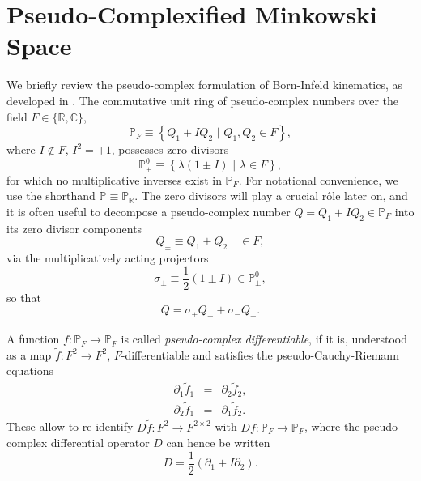 \documentclass[a4paper,aps,prd,showkeys,showpacs,superscriptaddress,preprint]{revtex4}
\newcommand{\pc}{\mathbb{P}}
\newcommand{\reals}{\mathbb{R}}
\begin{document}
\section{Pseudo-Complexified Minkowski Space\label{sec_pcM}}
We briefly review the pseudo-complex formulation of Born-Infeld
kinematics, as developed in \cite{Schuller:2002fn, Schuller:2002rr}.
The commutative unit ring of pseudo-complex numbers  over the field
$F \in \{\reals, \mathbb{C}\}$,
\begin{equation}
  \pc_F \equiv \left\{ Q_1 + I Q_2 \,\, | \,\, Q_1, Q_2 \in F \right\},
\end{equation}
where $I \not\in F$, $I^2=+1$, possesses zero divisors
\begin{equation}\label{zerodiv}
  \pc_\pm^0 \equiv \left\{ \lambda(1\pm I)\,\, |\,\, \lambda \in F
  \right\},
\end{equation}
for which no multiplicative inverses exist in $\pc_F$.
For notational convenience, we use the shorthand $\pc \equiv \pc_\reals$. 
The zero divisors will play a crucial r\^ole later on, and it is 
often useful to decompose a pseudo-complex number $Q
= Q_1 + I Q_2 \in \pc_F$ into its zero divisor components 
\begin{equation}
  Q_\pm \equiv Q_1 \pm Q_2 \quad \in F,
\end{equation}
via the multiplicatively acting projectors
\begin{equation}
  \sigma_\pm \equiv \frac{1}{2}(1 \pm I) \in \pc^0_\pm,
\end{equation}
so that
\begin{equation}\label{zd_comp}
  Q = \sigma_+ Q_+ + \sigma_- Q_-.
\end{equation}

A function $f: \pc_F \longrightarrow \pc_F$ is called
\textsl{pseudo-complex differentiable}, if it is, understood as a map
$\tilde f: F^2 \longrightarrow F^2$, $F$-differentiable and satisfies
the pseudo-Cauchy-Riemann equations
\begin{subequations}\label{PCR}
\begin{eqnarray}
  \partial_1 \tilde f_1 &=& \partial_2 \tilde f_2,\label{PCR1}\\
  \partial_2 \tilde f_1 &=& \partial_1 \tilde f_2.\label{PCR2}
\end{eqnarray}
\end{subequations}
These allow to re-identify $D\tilde f: F^2 \longrightarrow F^{2\times
2}$ with $Df: \pc_F \longrightarrow \pc_F$, where the pseudo-complex
differential operator $D$ can hence be written
\begin{equation}
  D = \frac{1}{2}(\partial_1 + I \partial_2).
\end{equation}
\end{document}
